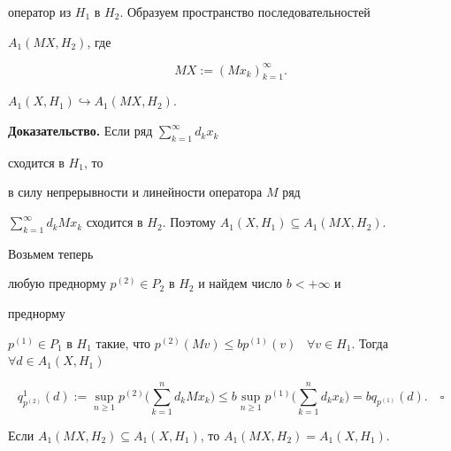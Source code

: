 оператор из $H_1$ в $H_2$. Образуем пространство последовательностей


$A_1(MX,H_2)$, где


$$


MX:=(Mx_k)_{k=1}^{\infty}.


$$








\begin{prop}


$A_1(X,H_1)\hookrightarrow A_1(MX,H_2)$.


\end{prop}








{\bf Доказательство.} Если ряд $\sum\limits_{k=1}^{\infty}d_kx_k$


сходится в $H_1$, то


в силу непрерывности и линейности оператора $M$ ряд


$\sum\limits_{k=1}^{\infty}


d_kMx_k$ сходится в $H_2$. Поэтому $A_1(X,H_1)\subseteq A_1(MX,H_2)$.


Возьмем теперь


любую преднорму $p^{(2)}\in P_2$ в $H_2$ и найдем число $b<+\infty$ и


преднорму


$p^{(1)}\in P_1$ в $H_1$ такие, что $p^{(2)}(Mv)\le bp^{(1)}(v)$ \, $\forall


v\in H_1$. Тогда $\forall d\in A_1(X,H_1)$


$$


q^1_{p^{(2)}}(d):=\sup\limits_{n\ge 1}p^{(2)}


\bigg(\sum\limits^n_{k=1}d_kMx_k\bigg)\le b\sup\limits_{n\ge


1}p^{(1)}\bigg(\sum\limits^n_{k=1}


d_kx_k\bigg)=bq_{p^{(1)}}(d).\quad\square


$$








\begin{cornonum}


Если $A_1(MX,H_2)\subseteq A_1(X,H_1)$, то $A_1(MX,H_2)=A_1(X,H_1)$.


\end{cornonum}





